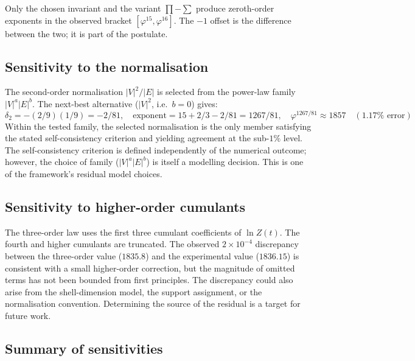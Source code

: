 \documentclass[12pt]{article}
\newcommand{\phig}{\varphi}
\begin{document}
Only the chosen invariant and the variant $\prod - \sum$ produce zeroth-order exponents in the observed bracket $[\phig^{15}, \phig^{16}]$. The $-1$ offset is the difference between the two; it is part of the postulate.

\subsection{Sensitivity to the normalisation}

The second-order normalisation $|V|^2/|E|$ is selected from the power-law family $|V|^a |E|^b$. The next-best alternative ($|V|^2$, i.e.\ $b = 0$) gives:
\[
\delta_2 = -(2/9)(1/9) = -2/81, \quad \text{exponent} = 15 + 2/3 - 2/81 = 1267/81, \quad \phig^{1267/81} \approx 1857 \quad (1.17\% \text{ error})
\]
Within the tested family, the selected normalisation is the only member satisfying the stated self-consistency criterion and yielding agreement at the sub-$1\%$ level. The self-consistency criterion is defined independently of the numerical outcome; however, the choice of family ($|V|^a |E|^b$) is itself a modelling decision. This is one of the framework's residual model choices.

\subsection{Sensitivity to higher-order cumulants}

The three-order law uses the first three cumulant coefficients of $\ln Z(t)$. The fourth and higher cumulants are truncated. The observed $2 \times 10^{-4}$ discrepancy between the three-order value ($1835.8$) and the experimental value ($1836.15$) is consistent with a small higher-order correction, but the magnitude of omitted terms has not been bounded from first principles. The discrepancy could also arise from the shell-dimension model, the support assignment, or the normalisation convention. Determining the source of the residual is a target for future work.

\subsection{Summary of sensitivities}
\end{document}
